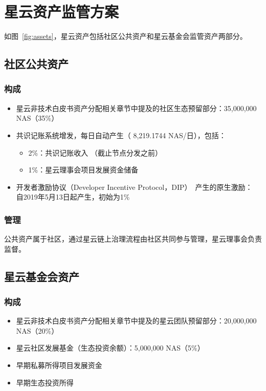 \section{星云资产监管方案}

如图~\ref{fig:assets}，星云资产包括社区公共资产和星云基金会监管资产两部分。

\subsection{社区公共资产}

\subsubsection{构成}

\begin{itemize}
	\item 星云非技术白皮书资产分配相关章节中提及的社区生态预留部分：35,000,000 NAS（35\%）
    \item 共识记账系统增发，每日自动产生（ 8,219.1744 NAS/日），包括：
	    \begin{itemize}
			\item 2\%：共识记账收入 （截止节点分发之前）
			\item 1\%：星云理事会项目发展资金储备
		\end{itemize}
	\item 开发者激励协议（Developer Incentive Protocol，DIP）~\cite{mauvepaper}产生的原生激励： 自2019年5月13日起产生，初始为1\%
\end{itemize}

\subsubsection{管理}

公共资产属于社区，通过星云链上治理流程由社区共同参与管理，星云理事会负责监督。

\subsection{星云基金会资产}

\subsubsection{构成}

\begin{itemize}
	\item 星云非技术白皮书资产分配相关章节中提及的星云团队预留部分：20,000,000 NAS（20\%）
    \item 星云社区发展基金（生态投资余额）：5,000,000 NAS（5\%）
	\item 早期私募所得项目发展资金
	\item 早期生态投资所得
\end{itemize}

